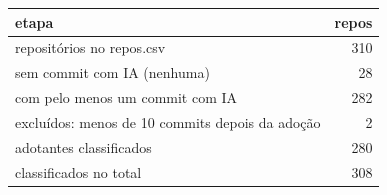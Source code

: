 \begin{tabular}{lr}
\toprule
etapa & repos \\
\midrule
repositórios no repos.csv & 310 \\
sem commit com IA (nenhuma) & 28 \\
com pelo menos um commit com IA & 282 \\
excluídos: menos de 10 commits depois da adoção & 2 \\
adotantes classificados & 280 \\
classificados no total & 308 \\
\bottomrule
\end{tabular}
